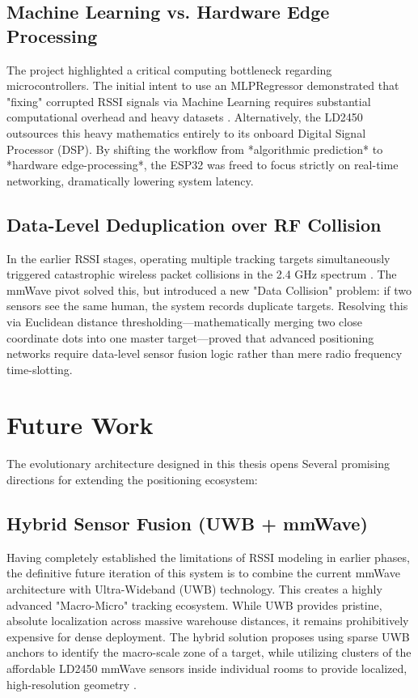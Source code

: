 \subsection{Machine Learning vs. Hardware Edge Processing}
The project highlighted a critical computing bottleneck regarding microcontrollers. The initial intent to use an MLPRegressor demonstrated that "fixing" corrupted RSSI signals via Machine Learning requires substantial computational overhead and heavy datasets \cite{he2016wifi}. Alternatively, the LD2450 outsources this heavy mathematics entirely to its onboard Digital Signal Processor (DSP). By shifting the workflow from *algorithmic prediction* to *hardware edge-processing*, the ESP32 was freed to focus strictly on real-time networking, dramatically lowering system latency.

\subsection{Data-Level Deduplication over RF Collision}
In the earlier RSSI stages, operating multiple tracking targets simultaneously triggered catastrophic wireless packet collisions in the 2.4 GHz spectrum \cite{lemic2017experimental}. The mmWave pivot solved this, but introduced a new "Data Collision" problem: if two sensors see the same human, the system records duplicate targets. Resolving this via Euclidean distance thresholding—mathematically merging two close coordinate dots into one master target—proved that advanced positioning networks require data-level sensor fusion logic rather than mere radio frequency time-slotting.

\section{Future Work}

The evolutionary architecture designed in this thesis opens Several promising directions for extending the positioning ecosystem:

\subsection{Hybrid Sensor Fusion (UWB + mmWave)}
Having completely established the limitations of RSSI modeling in earlier phases, the definitive future iteration of this system is to combine the current mmWave architecture with Ultra-Wideband (UWB) technology. This creates a highly advanced "Macro-Micro" tracking ecosystem. While UWB provides pristine, absolute localization across massive warehouse distances, it remains prohibitively expensive for dense deployment. The hybrid solution proposes using sparse UWB anchors to identify the macro-scale zone of a target, while utilizing clusters of the affordable LD2450 mmWave sensors inside individual rooms to provide localized, high-resolution geometry \cite{bahl2000radar}.

